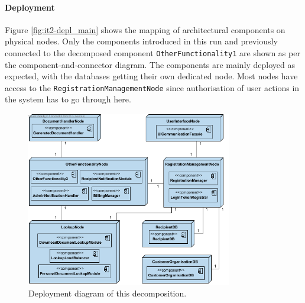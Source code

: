 \documentclass[a4paper,10pt]{article}
\begin{document}

\paragraph{Deployment}
Figure \ref{fig:it2-depl_main} shows the mapping of architectural components on physical nodes. Only the components introduced in this run and previously connected to the decomposed component \texttt{OtherFunctionality1} are shown as per the component-and-connector diagram. The components are mainly deployed as expected, with the databases getting their own dedicated node. Most nodes have access to the \texttt{RegistrationManagementNode} since authorisation of user actions in the system has to go through here.

\begin{figure}[!htp]
    \centering
    \includegraphics[width=0.8\textwidth]{depl_diag_3.png}
    \caption{Deployment diagram of this decomposition.
        }\label{fig:it3-depl_main}
\end{figure}
\end{document}
